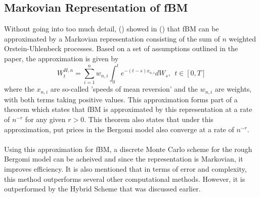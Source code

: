 \documentclass[12pt,oneside]{article}
\begin{document}
\subsection{Markovian Representation of fBM}
Without going into too much detail, (\cite{HARMS}) showed in (\cite{PAPER}) that fBM can be approximated by a Markovian representation consisting of the sum of $n$ weighted Orstein-Uhlenbeck processes.  Based on a set of assumptions outlined in the paper, the approximation is given by $$W_t^{H,n} = \sum_{i=1}^n w_{n,i} \int_0^t e^{-(t-s)x_{n,i}}dW_s, \ \ t \in [0,T]$$ where the $x_{n,i}$ are so-called 'speeds of mean reversion' and the $w_{n,i}$ are weights, with both terms taking positive values. This approximation forms part of a theorem which states that fBM is approximated by this representation at a rate of $n^{-r}$ for any given $r>0$.  This theorem also states that under this approximation, put prices in the Bergomi model also converge at a rate of $n^{-r}$. 
\\
\\
Using this approximation for fBM, a discrete Monte Carlo scheme for the rough Bergomi model can be acheived and since the representation is Markovian, it improves efficiency. It is also mentioned that in terms of error and complexity,  this method outperforms several other computational methods. However, it is outperformed by the Hybrid Scheme that was discussed earlier. 
\end{document}
